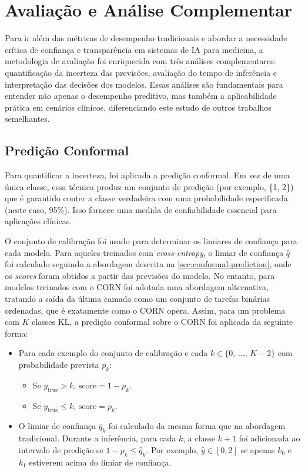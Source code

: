 \section{Avaliação e Análise Complementar}

Para ir além das métricas de desempenho tradicionais e abordar a necessidade crítica de confiança e transparência em sistemas de IA para medicina, a metodologia de avaliação foi enriquecida com três análises complementares: quantificação da incerteza das previsões, avaliação do tempo de inferência e interpretação das decisões dos modelos. Essas análises são fundamentais para entender não apenas o desempenho preditivo, mas também a aplicabilidade prática em cenários clínicos, diferenciando este estudo de outros trabalhos semelhantes.

\subsection{Predição Conformal}

Para quantificar a incerteza, foi aplicada a predição conformal. Em vez de uma única classe, essa técnica produz um conjunto de predição (por exemplo, \{1, 2\}) que é garantido conter a classe verdadeira com uma probabilidade especificada (neste caso, 95\%). Isso fornece uma medida de confiabilidade essencial para aplicações clínicas.

O conjunto de calibração foi usado para determinar os limiares de confiança para cada modelo. Para aqueles treinados com \textit{cross-entropy}, o limiar de confiança $\hat{q}$ foi calculado seguindo a abordagem descrita na \autoref{sec:conformal-prediction}, onde os \textit{scores} foram obtidos a partir das previsões do modelo. No entanto, para modelos treinados com o CORN foi adotada uma abordagem alternativa, tratando a saída da última camada como um conjunto de tarefas binárias ordenadas, que é exatamente como o CORN opera. Assim, para um problema com $K$ classes KL, a predição conformal sobre o CORN foi aplicada da seguinte forma:

\begin{itemize}
    \item Para cada exemplo do conjunto de calibração e cada $k \in \lbrace 0 \text{, } ... \text{, } K-2 \rbrace$ com probabilidade prevista $p_k$:
        \begin{itemize}
            \item Se $y_{\text{true}} > k$, $\text{score} = 1 - p_k$.
            \item Se $y_{\text{true}} \leq k$, $\text{score} = p_k$.
        \end{itemize}
    \item O limiar de confiança $\hat{q}_k$ foi calculado da mesma forma que na abordagem tradicional. Durante a inferência, para cada $k$, a classe $k+1$ foi adicionada ao intervalo de predição se $1 - p_k \leq \hat{q}_k$. Por exemplo, $\hat{y} \in [0,2]$ se apenas $k_0$ e $k_1$ estiverem acima do limiar de confiança.
\end{itemize}

